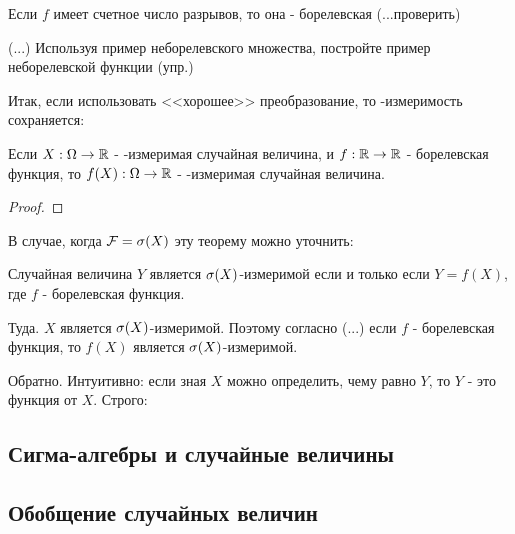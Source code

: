 {\begin{myth} Если $f$ имеет счетное число разрывов, то она - борелевская (...проверить)
\end{myth}
(...) Используя пример неборелевского множества, постройте пример неборелевской функции (упр.)

Итак, если использовать <<хорошее>> преобразование, то \F-измеримость сохраняется:

\begin{myth} Если $X:\Omega\to\mathbb{R}$ - \F-измеримая случайная величина, и $f:\mathbb{R}\to\mathbb{R}$ - борелевская функция, то $f(X):\Omega\to\mathbb{R}$ - \F-измеримая случайная величина.
\end{myth}
\begin{proof}
\end{proof}
В случае, когда $\mathcal{F}=\sigma(X)$ эту теорему можно уточнить: 

\begin{myth} Случайная величина $Y$ является $\sigma(X)$-измеримой если и только если $Y=f(X)$, где $f$ - борелевская функция.
\end{myth}
Туда. $X$ является $\sigma(X)$-измеримой. Поэтому согласно (...) если $f$ - борелевская функция, то $f(X)$ является $\sigma(X)$-измеримой.

Обратно.  Интуитивно: если зная $X$ можно определить, чему равно $Y$, то $Y$ - это функция от $X$. Строго: 



}\subsection{Сигма-алгебры и случайные величины} \subsection{Обобщение случайных величин} \problemtext{

}
